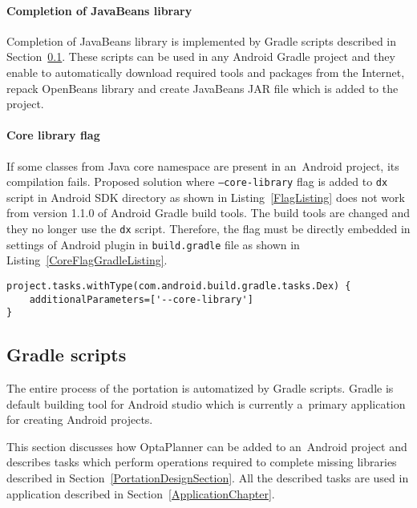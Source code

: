 \paragraph{Completion of JavaBeans library}
Completion of JavaBeans library is implemented by Gradle scripts described in Section~\ref{GradleScriptsSection}. These
scripts can be used in any Android Gradle project and they enable to automatically download required tools and packages
from the Internet, repack OpenBeans library and create JavaBeans JAR file which is added to the project.

\paragraph{Core library flag}
If some classes from Java core namespace are present in an~Android project, its compilation fails. Proposed solution
where \texttt{--core-library} flag is added to \texttt{dx} script in Android SDK directory as shown in
Listing~\ref{FlagListing} does not work from version 1.1.0 of Android Gradle build tools. The build tools are changed
and they no longer use the \texttt{dx} script. Therefore, the flag must be directly embedded in settings of Android
plugin in \texttt{build.gradle} file as shown in Listing~\ref{CoreFlagGradleListing}.
\\
\begin{lstlisting}[captionpos={b},caption={Addition of Core library flag in \texttt{build.gradle} script.},frame={lines},
label={CoreFlagGradleListing},basicstyle=\footnotesize]
project.tasks.withType(com.android.build.gradle.tasks.Dex) {
    additionalParameters=['--core-library']
}
\end{lstlisting}

\subsection{Gradle scripts}\label{GradleScriptsSection}
The entire process of the portation is automatized by Gradle scripts. Gradle is default building tool for Android studio
which is currently a~primary application for creating Android projects.

This section discusses how OptaPlanner can be added to an~Android project and describes tasks which perform operations
required to complete missing libraries described in Section~\ref{PortationDesignSection}.  All the described tasks are
used in application described in Section~\ref{ApplicationChapter}.

